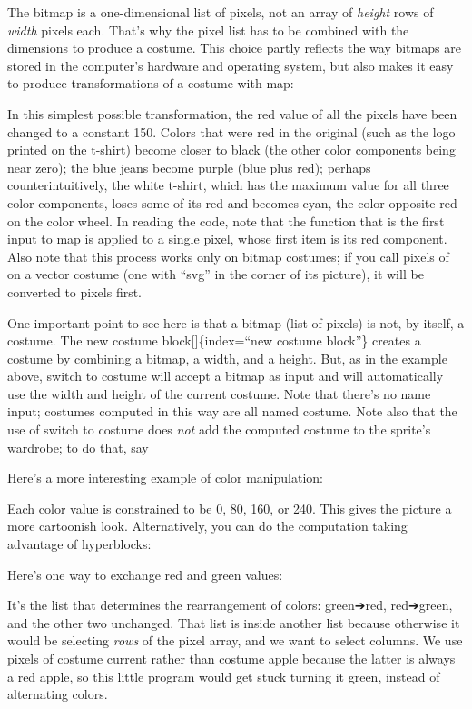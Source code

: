 \documentclass[
  letterpaper,
]{book}
\begin{document}
The bitmap is a one-dimensional list of pixels, not an array of
\emph{height} rows of \emph{width} pixels each. That's why the pixel
list has to be combined with the dimensions to produce a costume. This
choice partly reflects the way bitmaps are stored in the computer's
hardware and operating system, but also makes it easy to produce
transformations of a costume with map:

In this simplest possible transformation, the red value of all the
pixels have been changed to a constant 150. Colors that were red in the
original (such as the logo printed on the t-shirt) become closer to
black (the other color components being near zero); the blue jeans
become purple (blue plus red); perhaps counterintuitively, the white
t-shirt, which has the maximum value for all three color components,
loses some of its red and becomes cyan, the color opposite red on the
color wheel. In reading the code, note that the function that is the
first input to map is applied to a single pixel, whose first item is its
red component. Also note that this process works only on bitmap
costumes; if you call pixels of on a vector costume (one with ``svg'' in
the corner of its picture), it will be converted to pixels first.

One important point to see here is that a bitmap (list of pixels) is
not, by itself, a costume. The new costume block{[}{]}\{index=``new
costume block''\} creates a costume by combining a bitmap, a width, and
a height. But, as in the example above, switch to costume will accept a
bitmap as input and will automatically use the width and height of the
current costume. Note that there's no name input; costumes computed in
this way are all named costume. Note also that the use of switch to
costume does \emph{not} add the computed costume to the sprite's
wardrobe; to do that, say

Here's a more interesting example of color manipulation:

Each color value is constrained to be 0, 80, 160, or 240. This gives the
picture a more cartoonish look. Alternatively, you can do the
computation taking advantage of hyperblocks:

Here's one way to exchange red and green values:

It's the list that determines the rearrangement of colors: green➔red,
red➔green, and the other two unchanged. That list is inside another list
because otherwise it would be selecting \emph{rows} of the pixel array,
and we want to select columns. We use pixels of costume current rather
than costume apple because the latter is always a red apple, so this
little program would get stuck turning it green, instead of alternating
colors.
\end{document}
